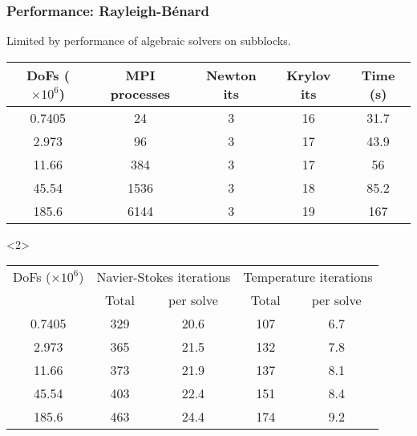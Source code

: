 \documentclass[presentation,aspectratio=43]{beamer}
\begin{document}
\begin{frame}
  \frametitle{Performance: Rayleigh-B\'enard}
  Limited by performance of algebraic solvers on subblocks.
  \begin{center}
    \scriptsize
  \begin{tabular}{c|c|c|c|c}
DoFs ($\times 10^{6}$) & MPI processes & Newton its & Krylov its & Time (s)\\
\hline
0.7405 & 24 & 3 & 16 & 31.7\\
2.973 & 96 & 3 & 17 & 43.9\\
11.66 & 384 & 3 & 17 & 56\\
45.54 & 1536 & 3 & 18 & 85.2\\
185.6 & 6144 & 3 & 19 & 167\\
  \end{tabular}

  \begin{uncoverenv}<2>
  \begin{tabular}{c|c|c|c|c}
    DoFs ($\times 10^{6}$) & \multicolumn{2}{|c|}{Navier-Stokes iterations} & \multicolumn{2}{|c}{Temperature iterations}\\
    & Total & per solve & Total & per solve\\
\hline
0.7405 & 329 & 20.6 & 107 & 6.7 \\
2.973  & 365 & 21.5 & 132 & 7.8 \\
11.66  & 373 & 21.9 & 137 & 8.1 \\
45.54  & 403 & 22.4 & 151 & 8.4 \\
185.6  & 463 & 24.4 & 174 & 9.2 \\
  \end{tabular}
\end{uncoverenv}
  \end{center}
\end{frame}
\end{document}

